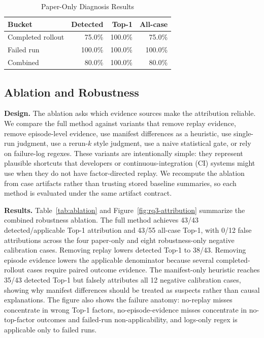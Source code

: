 \begin{table}[!t]
  \caption{Paper-Only Diagnosis Results}
  \label{tab:paper-results}
  \centering
  \footnotesize
  \renewcommand{\arraystretch}{1.12}
  \begin{tabular}{@{}lrrr@{}}
    \toprule
    Bucket & Detected & Top-1 & All-case \\
    \midrule
    Completed rollout & 75.0\% & 100.0\% & 75.0\% \\
    Failed run & 100.0\% & 100.0\% & 100.0\% \\
    Combined & 80.0\% & 100.0\% & 80.0\% \\
    \bottomrule
  \end{tabular}
\end{table}

\subsection{Ablation and Robustness}
\label{sub:ablation}

\noindent\textbf{Design.} The ablation asks which evidence sources make the attribution reliable. We compare the full method against variants that remove replay evidence, remove episode-level evidence, use manifest differences as a heuristic, use single-run judgment, use a rerun-$k$ style judgment, use a naive statistical gate, or rely on failure-log regexes. These variants are intentionally simple: they represent plausible shortcuts that developers or continuous-integration (CI) systems might use when they do not have factor-directed replay. We recompute the ablation from case artifacts rather than trusting stored baseline summaries, so each method is evaluated under the same artifact contract.

\noindent\textbf{Results.} Table~\ref{tab:ablation} and Figure~\ref{fig:rq3-attribution} summarize the combined robustness ablation. The full method achieves 43/43 detected/applicable Top-1 attribution and 43/55 all-case Top-1, with 0/12 false attributions across the four paper-only and eight robustness-only negative calibration cases. Removing replay lowers detected Top-1 to 38/43. Removing episode evidence lowers the applicable denominator because several completed-rollout cases require paired outcome evidence. The manifest-only heuristic reaches 35/43 detected Top-1 but falsely attributes all 12 negative calibration cases, showing why manifest differences should be treated as suspects rather than causal explanations. The figure also shows the failure anatomy: no-replay misses concentrate in wrong Top-1 factors, no-episode-evidence misses concentrate in no-top-factor outcomes and failed-run non-applicability, and logs-only regex is applicable only to failed runs.

